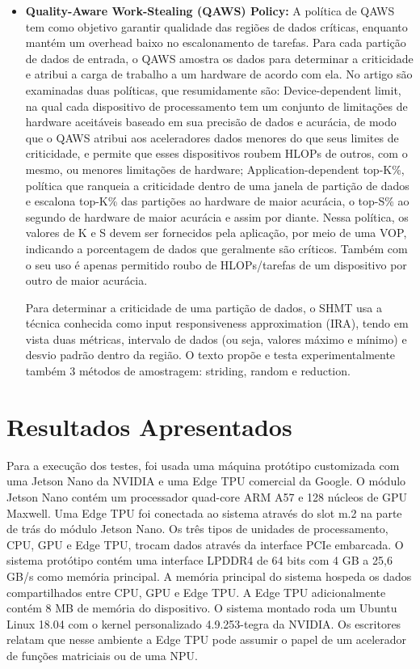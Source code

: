 \documentclass{article}
\begin{document}
\begin{itemize}
  \item \textbf{Quality-Aware Work-Stealing (QAWS) Policy:} A política de QAWS tem como objetivo garantir qualidade das regiões de dados críticas, enquanto mantém um overhead baixo no escalonamento de tarefas. Para cada partição de dados de entrada, o QAWS amostra os dados para determinar a criticidade e atribui a carga de trabalho a um hardware de acordo com ela. No artigo são examinadas duas políticas, que resumidamente são: Device-dependent limit, na qual cada dispositivo de processamento tem um conjunto de limitações de hardware aceitáveis baseado em sua precisão de dados e acurácia, de modo que o QAWS atribui aos aceleradores dados menores do que seus limites de criticidade, e permite que esses dispositivos roubem HLOPs de outros, com o mesmo, ou menores limitações de hardware; Application-dependent top-K\%, política que ranqueia a criticidade dentro de uma janela de partição de dados e escalona top-K\% das partições ao hardware de maior acurácia, o top-S\% ao segundo de hardware de maior acurácia e assim por diante. Nessa política, os valores de K e S devem ser fornecidos pela aplicação, por meio de uma VOP, indicando a porcentagem de dados que geralmente são críticos. Também com o seu uso é apenas permitido roubo de HLOPs/tarefas de um dispositivo por outro de maior acurácia.

Para determinar a criticidade de uma partição de dados, o SHMT usa a técnica conhecida como input responsiveness approximation (IRA), tendo em vista duas métricas, intervalo de dados (ou seja, valores máximo e mínimo) e desvio padrão dentro da região. O texto propõe e testa experimentalmente também 3 métodos de amostragem: striding, random e reduction.
\end{itemize}

\section{Resultados Apresentados}
Para a execução dos testes, foi usada uma máquina protótipo customizada com uma Jetson Nano da NVIDIA e uma Edge TPU comercial da Google. O módulo Jetson Nano contém um processador quad-core ARM A57 e 128 núcleos de GPU Maxwell. Uma Edge TPU foi conectada ao sistema através do slot m.2 na parte de trás do módulo Jetson Nano. Os três tipos de unidades de processamento, CPU, GPU e Edge TPU, trocam dados através da interface PCIe embarcada. O sistema protótipo contém uma interface LPDDR4 de 64 bits com 4 GB a 25,6 GB/s como memória principal. A memória principal do sistema hospeda os dados compartilhados entre CPU, GPU e Edge TPU. A Edge TPU adicionalmente contém 8 MB de memória do dispositivo. O sistema montado roda um Ubuntu Linux 18.04 com o kernel personalizado 4.9.253-tegra da NVIDIA. Os escritores relatam que nesse ambiente a Edge TPU pode assumir o papel de um acelerador de funções matriciais ou de uma NPU.
\end{document}
